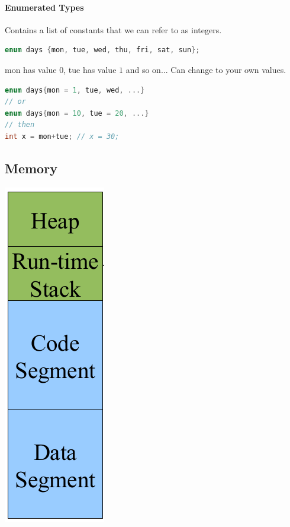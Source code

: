 \documentclass[12 pt]{article}
\begin{document}
\paragraph{Enumerated Types}
Contains a list of constants that we can refer to as integers.
\begin{lstlisting}[language=c]
enum days {mon, tue, wed, thu, fri, sat, sun};
\end{lstlisting}
mon has value $0$, tue has value $1$ and so on... Can change to your own values.
\begin{lstlisting}[language=c]
enum days{mon = 1, tue, wed, ...}
// or
enum days{mon = 10, tue = 20, ...}
// then
int x = mon+tue; // x = 30;
\end{lstlisting}
\subsection{Memory}
\includegraphics[scale=0.3]{proc}
\end{document}
